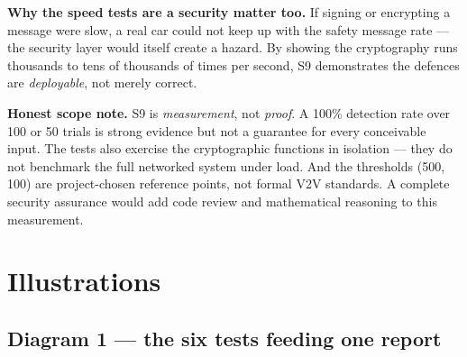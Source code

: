 \documentclass[11pt,a4paper]{report}
\begin{document}
\noindent\textbf{Why the speed tests are a security matter too.} If signing or
encrypting a message were slow, a real car could not keep up with the safety
message rate --- the security layer would itself create a hazard. By showing the
cryptography runs thousands to tens of thousands of times per second, S9
demonstrates the defences are \emph{deployable}, not merely correct.

\textbf{Honest scope note.} S9 is \emph{measurement}, not \emph{proof}. A 100\%
detection rate over 100 or 50 trials is strong evidence but not a guarantee for
every conceivable input. The tests also exercise the cryptographic functions in
isolation --- they do not benchmark the full networked system under load. And the
thresholds (500, 100) are project-chosen reference points, not formal V2V
standards. A complete security assurance would add code review and mathematical
reasoning to this measurement.

\section{Illustrations}

\subsection{Diagram 1 --- the six tests feeding one report}
\begin{center}
\end{center}
\end{document}
